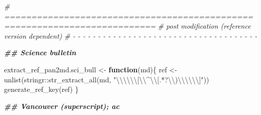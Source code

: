\documentclass[
]{article}
\newenvironment{Shaded}{\begin{snugshade}}{\end{snugshade}}
\newcommand{\CommentTok}[1]{\textcolor[rgb]{0.56,0.35,0.01}{\textit{#1}}}
\newcommand{\ControlFlowTok}[1]{\textcolor[rgb]{0.13,0.29,0.53}{\textbf{#1}}}
\newcommand{\DocumentationTok}[1]{\textcolor[rgb]{0.56,0.35,0.01}{\textbf{\textit{#1}}}}
\newcommand{\FunctionTok}[1]{\textcolor[rgb]{0.00,0.00,0.00}{#1}}
\newcommand{\NormalTok}[1]{#1}
\newcommand{\OtherTok}[1]{\textcolor[rgb]{0.56,0.35,0.01}{#1}}
\newcommand{\SpecialCharTok}[1]{\textcolor[rgb]{0.00,0.00,0.00}{#1}}
\newcommand{\StringTok}[1]{\textcolor[rgb]{0.31,0.60,0.02}{#1}}
\begin{document}
\begin{Shaded}
\begin{Highlighting}[]
\CommentTok{\# ==========================================================================}
\CommentTok{\# post modification (reference version dependent)}
\CommentTok{\# {-} {-} {-} {-} {-} {-} {-} {-} {-} {-} {-} {-} {-} {-} {-} {-} {-} {-} {-} {-} {-} {-} {-} {-} {-} {-} {-} {-} {-} {-} {-} {-} {-} {-} {-} {-} {-}}

\DocumentationTok{\#\# Science bulletin}

\NormalTok{extract\_ref\_pan2md.sci\_bull }\OtherTok{\textless{}{-}} \ControlFlowTok{function}\NormalTok{(md)\{}
\NormalTok{  ref }\OtherTok{\textless{}{-}} \FunctionTok{unlist}\NormalTok{(stringr}\SpecialCharTok{::}\FunctionTok{str\_extract\_all}\NormalTok{(md, }\StringTok{"}\SpecialCharTok{\textbackslash{}\textbackslash{}\textbackslash{}\textbackslash{}\textbackslash{}\textbackslash{}}\StringTok{[}\SpecialCharTok{\textbackslash{}\textbackslash{}}\StringTok{\^{}}\SpecialCharTok{\textbackslash{}\textbackslash{}}\StringTok{[.*?}\SpecialCharTok{\textbackslash{}\textbackslash{}}\StringTok{)}\SpecialCharTok{\textbackslash{}\textbackslash{}\textbackslash{}\textbackslash{}\textbackslash{}\textbackslash{}}\StringTok{]"}\NormalTok{))}
  \FunctionTok{generate\_ref\_key}\NormalTok{(ref)}
\NormalTok{\}}

\DocumentationTok{\#\# Vancouver (superscript); ac}


\end{Highlighting}
\end{Shaded}
\end{document}
